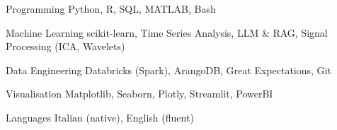 
\begin{cvskills}

  \cvskill
    {Programming}
    {Python, R, SQL, MATLAB, Bash}

  \cvskill
    {Machine Learning}
    {scikit-learn, Time Series Analysis, LLM \& RAG, Signal Processing (ICA, Wavelets)}

  \cvskill
    {Data Engineering}
    {Databricks (Spark), ArangoDB, Great Expectations, Git}

  \cvskill
    {Visualisation}
    {Matplotlib, Seaborn, Plotly, Streamlit, PowerBI}

  \cvskill
    {Languages}
    {Italian (native), English (fluent)}

\end{cvskills}











